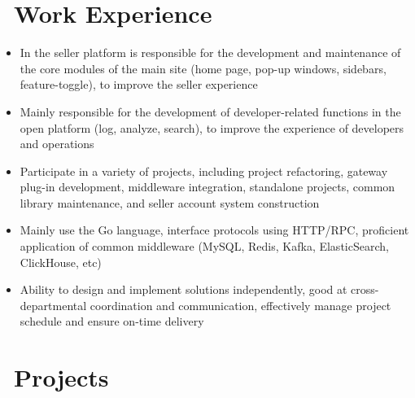 \documentclass{resume}
\newcommand{\en}[1]{#1}
\newcommand{\zh}[1]{}
\begin{document}
\section{\faBriefcase\ \en{Work Experience}\zh{工作经历}}
\en{}
\zh{\datedsubsection{\textbf{\href{https://www.sea.com/products/shopee/}{深圳虾皮信息科技发展有限公司}}}{2021/07 -- 至今}}
\en{}
\zh{\role{卖家平台 \& Shopee 开放平台}{后端开发工程师}}
\begin{itemize}[parsep=0.5ex]
      \item \en{In the seller platform is responsible for the development and maintenance of the core modules of the main site (home page, pop-up windows, sidebars, feature-toggle), to improve the seller experience}
            \zh{在卖家平台负责开发和维护主站核心模块(首页、弹窗、侧边栏、功能开关),提升卖家及运营使用体验}
      \item \en{Mainly responsible for the development of developer-related functions in the open platform (log, analyze, search), to improve the experience of developers and operations}
            \zh{在开放平台主要负责开发者相关功能的开发(日志、分析、搜索),提升开发者及运营体验}
      \item \en{Participate in a variety of projects, including project refactoring, gateway plug-in development, middleware integration, standalone projects, common library maintenance, and seller account system construction}
            \zh{参与多元化项目,包括项目重构、网关开发、中间件集成、独立项目、Common库维护及卖家账号系统构建等}
      \item \en{Mainly use the Go language, interface protocols using HTTP/RPC, proficient application of common middleware (MySQL, Redis, Kafka, ElasticSearch, ClickHouse, etc)}
            \zh{主要使用 Go 语言,接口协议采用 HTTP/RPC,熟练应用常用中间件(MySQL,Redis,Kafka,ElasticSearch,ClickHouse,etc)}
      \item \en{Ability to design and implement solutions independently, good at cross-departmental coordination and communication, effectively manage project schedule and ensure on-time delivery}
            \zh{具有独立设计和实施解决方案的能力,善于跨部门协作与沟通,有效管理项目进度并确保按时交付}
\end{itemize}

\section{\faCloud\ \en{Projects}\zh{工作项目}}
\end{document}
